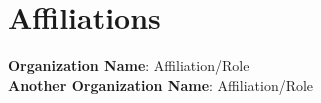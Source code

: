 \section{Affiliations}

 \begin{itemize}[leftmargin=0.15in, label={}]
    {\item{
        \textbf{Organization Name}{: Affiliation/Role} \\
        \textbf{Another Organization Name}{: Affiliation/Role} \\
    }}
 \end{itemize}
